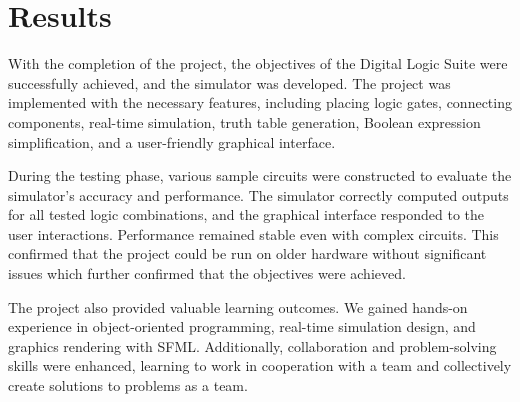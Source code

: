\section{Results}

With the completion of the project, the objectives of the Digital Logic Suite were successfully achieved, and the simulator was developed. The project was implemented with the necessary features, including placing logic gates, connecting components, real-time simulation, truth table generation, Boolean expression simplification, and a user-friendly graphical interface.

\vspace{0.5cm}
During the testing phase, various sample circuits were constructed to evaluate the simulator's accuracy and performance. The simulator correctly computed outputs for all tested logic combinations, and the graphical interface responded to the user interactions. Performance remained stable even with complex circuits. This confirmed that the project could be run on older hardware without significant issues which further confirmed that the objectives were achieved.

\vspace{0.5cm}
The project also provided valuable learning outcomes. We gained hands-on experience in object-oriented programming, real-time simulation design, and graphics rendering with SFML. Additionally, collaboration and problem-solving skills were enhanced, learning to work in cooperation with a team and collectively create solutions to problems as a team.
\clearpage